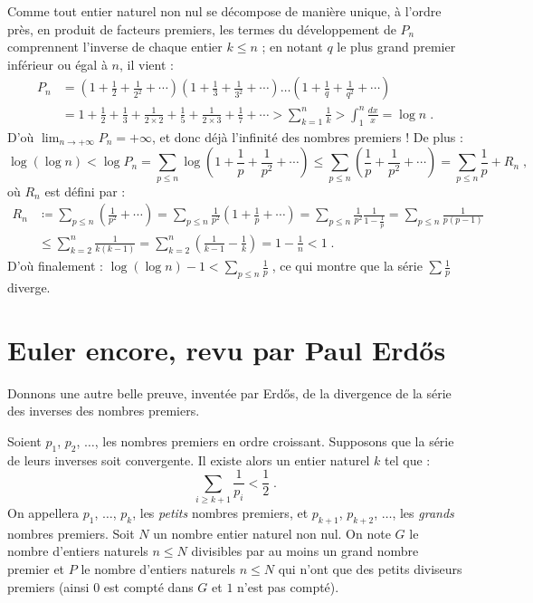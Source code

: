 \documentclass[a4paper,11pt]{article}
\begin{document}
Comme tout entier naturel non nul se décompose de manière unique, à
l'ordre près, en produit de facteurs premiers, les termes du développement
de $P_n$ comprennent l'inverse de chaque entier $k\le n$ ; en notant $q$ le
plus grand premier inférieur ou égal à $n$, il vient :
\begin{align*}
 P_n &= \left(1+\frac{1}{2}+\frac{1}{2^2}+\cdots\right)
        \left(1+\frac{1}{3}+\frac{1}{3^2}+\cdots\right)\ldots
        \left(1+\frac{1}{q}+\frac{1}{q^2}+\cdots\right) \\
     &= 1+\frac{1}{2}+\frac{1}{3}+\frac{1}{2\times2}+\frac{1}{5}+
        \frac{1}{2\times3}+\frac{1}{7}+\cdots
      > \sum_{k=1}^n \frac{1}{k} > \int_1^n \frac{dx}{x} = \log n \;.
\end{align*}
D'où $\displaystyle\lim_{n\to+\infty}P_n=+\infty$,
et donc déjà l'infinité des nombres premiers ! De plus :
\[
  \log(\log n) < \log P_n
  = \sum_{p\le n} \log\left(1+\frac{1}{p}+\frac{1}{p^2}+\cdots\right)
  \le \sum_{p\le n} \left(\frac{1}{p}+\frac{1}{p^2}+\cdots\right)
  = \sum_{p\le n} \frac{1}{p} + R_n \;,
\]
où $R_n$ est défini par :
\begin{align*}
  R_n &\coloneq \sum_{p\le n} \left(\frac{1}{p^2}+\cdots\right)
      = \sum_{p\le n} \frac{1}{p^2}\left(1+\frac{1}{p}+\cdots\right)
      = \sum_{p\le n} \frac{1}{p^2}\frac{1}{1-\frac{1}{p}}
      = \sum_{p\le n} \frac{1}{p(p-1)} \\
      &\le \sum_{k=2}^n \frac{1}{k(k-1)}
      = \sum_{k=2}^n \left(\frac{1}{k-1}-\frac{1}{k}\right)
      = 1-\frac{1}{n} < 1 \;.
\end{align*}
D'où finalement :
$\displaystyle\log(\log n) - 1 < \sum_{p\le n} \frac{1}{p}\;$,
ce qui montre que la série $\displaystyle\sum\frac{1}{p}$ diverge.

\section{Euler encore, revu par Paul Erd\H{o}s}

Donnons une autre belle preuve, inventée par Erd\H{o}s, de la divergence
de la série des inverses des nombres premiers.

Soient $p_1$, $p_2$, $\ldots$, les nombres premiers en ordre
croissant. Supposons que la série de leurs inverses soit convergente.
Il existe alors un entier naturel $k$ tel que :
\[
  \sum_{i\ge k+1} \frac{1}{p_i} < \frac{1}{2} \;.
\]
On appellera $p_1$, $\ldots$, $p_k$, les \emph{petits} nombres premiers, et
$p_{k+1}$, $p_{k+2}$, $\ldots$, les \emph{grands} nombres premiers. Soit $N$
un nombre entier naturel non nul. On note $G$ le nombre d'entiers naturels
$n\le N$ divisibles par au moins un grand nombre premier et $P$ le nombre
d'entiers naturels $n\le N$ qui n'ont que des petits diviseurs premiers
(ainsi $0$ est compté dans $G$ et $1$ n'est pas compté).
\end{document}
